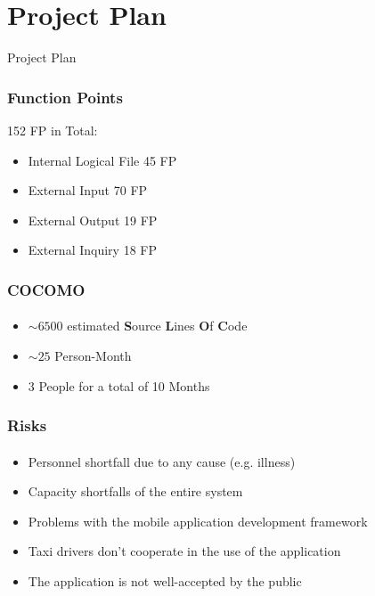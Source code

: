 \documentclass[10pt,xcolor={usenames,dvipsnames}]{beamer}
\begin{document}
\section[Section]{Project Plan}
\begin{frame}
	\begin{center}
		Project Plan
	\end{center}
\end{frame}
\begin{frame}
	\frametitle{Function Points}
	152 FP in Total:
	\begin{itemize}
		\item Internal Logical File 45 FP
		\item External Input 70 FP
		\item External Output 19 FP
		\item External Inquiry 18 FP
	\end{itemize}
\end{frame}
\begin{frame}
	\frametitle{COCOMO}
	\framesubtitle{}
	\begin{itemize}
		\item $\sim 6500$ estimated \textbf{S}ource \textbf{L}ines \textbf{O}f \textbf{C}ode
		\item $\sim 25$ Person-Month
		\item 3 People for a total of 10 Months
	\end{itemize}
\end{frame}
\begin{frame}
	\frametitle{Risks}
	\framesubtitle{}
	\begin{itemize}
		\item	Personnel shortfall due to any cause (e.g. illness)
		\item	Capacity shortfalls of the entire system
		\item	Problems with the mobile application development framework
		\item	Taxi drivers don't cooperate in the use of the application
		\item	The application is not well-accepted by the public
	\end{itemize}
\end{frame}
\end{document}
